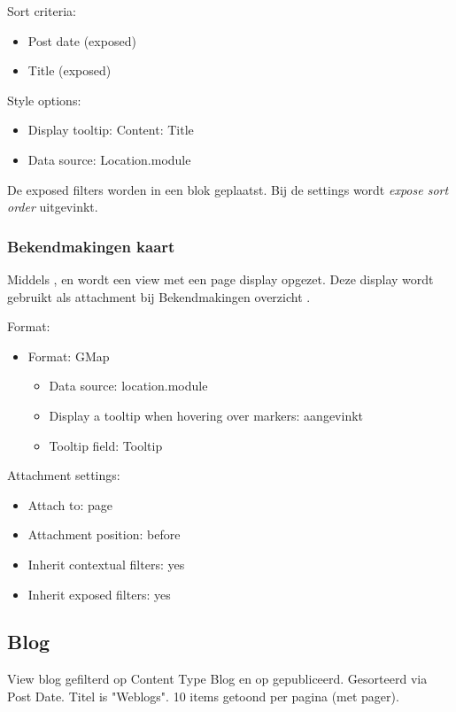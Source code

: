Sort criteria:
\begin{itemize}
\item Post date (exposed)
\item Title (exposed)
\end{itemize}

Style options:
\begin{itemize}
\item Display tooltip: Content: Title
\item Data source: Location.module
\end{itemize}

De exposed filters worden in een blok geplaatst. Bij de settings wordt \emph{expose sort order} uitgevinkt.

\subsubsection{Bekendmakingen kaart}\label{bekendmakingen-markers}

Middels ,  en  wordt een view met een page display opgezet. Deze display wordt gebruikt als attachment bij Bekendmakingen overzicht .

Format:
\begin{itemize}
\item Format: GMap
\begin{itemize}
\item Data source: location.module
\item Display a tooltip when hovering over markers: aangevinkt
\item Tooltip field: Tooltip
\end{itemize}
\end{itemize}

Attachment settings:
\begin{itemize}
\item Attach to: page
\item Attachment position: before
\item Inherit contextual filters: yes
\item Inherit exposed filters: yes
\end{itemize}

\subsection{Blog}
View blog gefilterd op Content Type Blog en op gepubliceerd. Gesorteerd via Post Date. Titel is "Weblogs". 10 items getoond per pagina (met pager).

